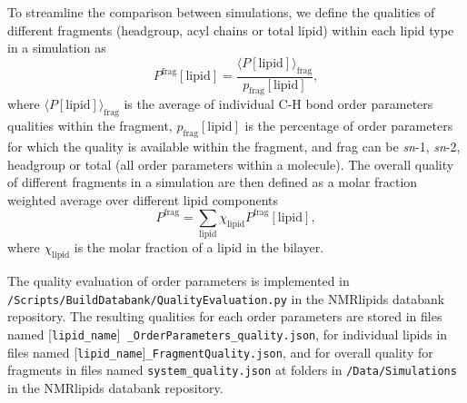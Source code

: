 \documentclass[fleqn,10pt]{wlscirep}
\begin{document}

To streamline the comparison between simulations, we define the qualities of different fragments (headgroup, acyl chains or total lipid) within each lipid type in a simulation as
\begin{equation}
    P^\mathrm{frag}[\mathrm{lipid}] = \frac{\langle P[\mathrm{lipid}]\rangle_\mathrm{frag}}{p_\mathrm{frag}[\mathrm{lipid}]},
\end{equation}
where $\langle P[\mathrm{lipid}]\rangle_\mathrm{frag}$ is the average of individual C-H bond order parameters qualities within the fragment, $p_\mathrm{frag}[\mathrm{lipid}]$ is the percentage of order parameters for which the quality is available within the fragment, and frag can be \textit{sn}-1, \textit{sn}-2, headgroup or total (all order parameters within a molecule). The overall quality of different fragments in a simulation are then defined as a molar fraction weighted average over different lipid components
\begin{equation}
    P^\mathrm{frag} = \sum_\mathrm{lipid} \chi_\mathrm{lipid} P^\mathrm{frag}[\mathrm{lipid}],
\end{equation}
where $\chi_\mathrm{lipid}$ is the molar fraction of a lipid in the bilayer.

The quality evaluation of order parameters is implemented in \texttt{/Scripts/BuildDatabank/QualityEvaluation.py} in the NMRlipids databank repository. The resulting qualities for each order parameters are stored in files named  [\texttt{lipid\_name}]\texttt{ \_OrderParameters\_quality.json}, for individual lipids in files named [\texttt{lipid\_name}]\texttt{\_FragmentQuality.json}, and for overall quality for fragments in files named \texttt{system\_quality.json} at folders in \texttt{/Data/Simulations} in the NMRlipids databank repository. 
\end{document}
